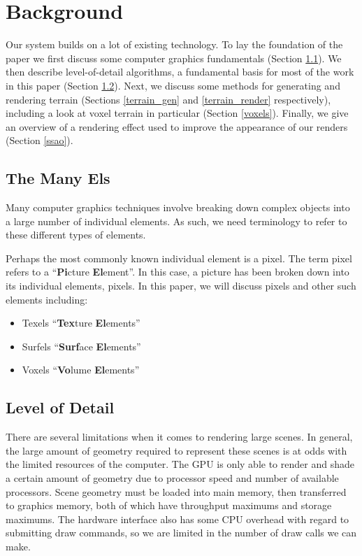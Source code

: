 \chapter{Background}

Our system builds on a lot of existing technology.
To lay the foundation of the paper we first discuss some computer graphics fundamentals (Section \ref{els}).
We then describe level-of-detail algorithms, a fundamental basis for most of the work in this paper (Section \ref{lod}).
Next, we discuss some methods for generating and rendering terrain (Sections \ref{terrain_gen} and \ref{terrain_render} respectively), including a look at voxel terrain in particular (Section \ref{voxels}).
Finally, we give an overview of a rendering effect used to improve the appearance of our renders (Section \ref{ssao}).


\section{The Many Els} \label{els}

Many computer graphics techniques involve breaking down complex objects into a large number of individual elements.
As such, we need terminology to refer to these different types of elements.

Perhaps the most commonly known individual element is a pixel.
The term pixel refers to a ``\textbf{Pi}cture \textbf{El}ement''.
In this case, a picture has been broken down into its individual elements, pixels.
In this paper, we will discuss pixels and other such elements including:

\begin{itemize}
	\item Texels ``\textbf{Tex}ture \textbf{El}ements''
	\item Surfels ``\textbf{Surf}ace \textbf{El}ements''
	\item Voxels ``\textbf{Vo}lume \textbf{El}ements''
\end{itemize}


\section{Level of Detail} \label{lod}

There are several limitations when it comes to rendering large scenes.
In general, the large amount of geometry required to represent these scenes is at odds with the limited resources of the computer.
The GPU is only able to render and shade a certain amount of geometry due to processor speed and number of available processors.
Scene geometry must be loaded into main memory, then transferred to graphics memory, both of which have throughput maximums and storage maximums.
The hardware interface also has some CPU overhead with regard to submitting draw commands, so we are limited in the number of draw calls we can make.

